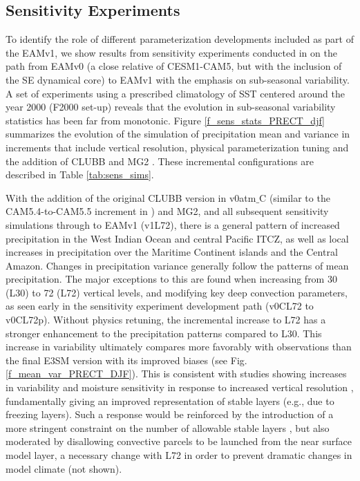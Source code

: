 \documentclass[draft,ms]{AGUTeX}
\begin{document}
\begin{article}
\section {Sensitivity Experiments}
\label{sec:sensitivity}
To identify the role of different parameterization developments included as part of the EAMv1, we show results from sensitivity experiments conducted in \cite{Xie2018} on the path from EAMv0 (a close relative of CESM1-CAM5, but with the inclusion of the SE dynamical core) to EAMv1 with the emphasis on sub-seasonal variability. A set of experiments using a prescribed climatology of SST centered around the year 2000 (F2000 set-up) reveals that the evolution in sub-seasonal variability statistics has been far from monotonic. Figure \ref{f_sens_stats_PRECT_djf} summarizes the evolution of the simulation of precipitation mean and variance in increments that include vertical resolution, physical parameterization tuning and the addition of CLUBB \citep{Golaz2002} and MG2 \citep{Gettelman2015}. These incremental configurations are described in Table \ref{tab:sens_sims}. 

With the addition of the original CLUBB version in v0atm$\_$C (similar to the CAM5.4-to-CAM5.5 increment in \cite{Bogenschutz2018}) and MG2, and all subsequent sensitivity simulations through to EAMv1 (v1L72), there is a general pattern of increased precipitation in the West Indian Ocean and central Pacific ITCZ, as well as local increases in precipitation over the Maritime Continent islands and the Central Amazon. Changes in precipitation variance generally follow the patterns of mean precipitation. The major exceptions to this are found when increasing from 30 (L30) to 72 (L72) vertical levels, and modifying key deep convection parameters, as seen early in the sensitivity experiment development path (v0CL72 to v0CL72p). Without physics retuning, the incremental increase to L72 has a stronger enhancement to the precipitation patterns compared to L30. This increase in variability ultimately compares more favorably with observations than the final E3SM version with its improved biases (see Fig. \ref{f_mean_var_PRECT_DJF}). This is consistent with studies showing increases in variability and moisture sensitivity in response to increased vertical resolution \citep{Inness2001a}, fundamentally giving an improved representation of stable layers (e.g., due to freezing layers). Such a response would be reinforced by the introduction of a more stringent constraint on the number of allowable stable layers \citep[decreased from 5 to 1,][]{Xie2018}, but also moderated by disallowing convective parcels to be launched from the near surface model layer, a necessary change with L72 in order to prevent dramatic changes in model climate (not shown). 


\end{article}
\end{document}
